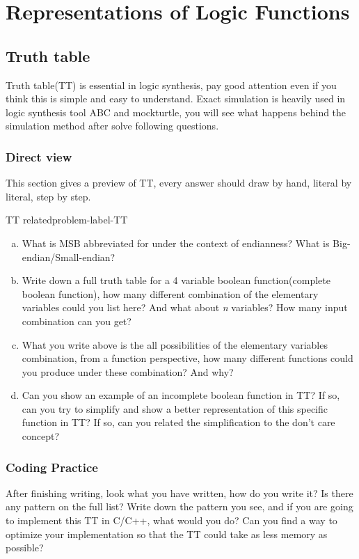 \documentclass[main.tex]{subfiles}
\begin{document}
\section{Representations of Logic Functions}
\subsection{Truth table}
Truth table(TT) is essential in logic synthesis, pay good attention even if you think this is simple and easy to understand. Exact simulation is heavily used in logic synthesis tool ABC and mockturtle, you will see what happens behind the simulation method after solve following questions.

\subsubsection{Direct view}
This section gives a preview of TT, every answer should draw by hand, literal by literal, step by step.
\begin{problem}{TT related}{problem-label-TT}
\begin{enumerate}[(a)]
    \item What is MSB abbreviated for under the context of endianness? What is Big-endian/Small-endian?
    \item Write down a full truth table for a 4 variable boolean function(complete boolean function), how many different combination of the elementary variables could you list here? And what about \emph{n} variables? How many input combination can you get?
    
    \item What you write above is the all possibilities of the elementary variables combination, from a function perspective, how many different functions could you produce under these combination? And why?

    \item Can you show an example of an incomplete boolean function in TT? If so, can you try to simplify and show a better representation of this specific function in TT? If so, can you related the simplification to the don't care concept?
\end{enumerate}
\end{problem}
\vspace*{4\baselineskip}
\subsubsection{Coding Practice}
After finishing writing, look what you have written, how do you write it? Is there any pattern on the full list? Write down the pattern you see, and if you are going to implement this TT in C/C++, what would you do? Can you find a way to optimize your implementation so that the TT could take as less memory as possible?
\end{document}
